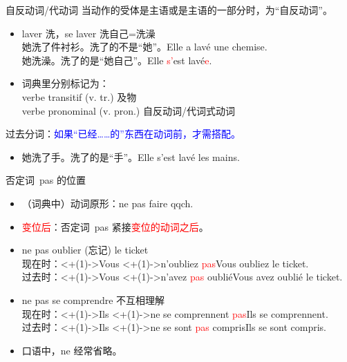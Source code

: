 \documentclass[french, aspectratio=169, 14pt, handout]{beamer}
\newcommand{\red}[1]{\textcolor{red}{#1}} %
\newcommand{\blue}[1]{\textcolor{blue}{#1}} %
\begin{document}
\begin{CJK*}{UTF8}{gkai}
\begin{frame}{自反动词/代动词}
当动作的受体是主语或是主语的一部分时，为“自反动词”。 \pause
\begin{itemize}
    \item laver 洗，se laver 洗自己=洗澡 \\
	她洗了件衬衫。洗了的不是“她”。Elle a lavé une chemise. \\
	她洗澡。洗了的是“她自己”。Elle \red{s'}est lavé\red{e}. \pause
    \item 词典里分别标记为： \\
    verbe transitif (v. tr.) 及物\\
    verbe pronominal (v. pron.) 自反动词/代词式动词 \pause
\end{itemize}
过去分词：\blue{如果“已经……的”东西在动词前，才需搭配。} \pause
\begin{itemize}
    \item 她洗了手。洗了的是“手”。Elle s'est lavé les mains.
\end{itemize}
\end{frame}

\begin{frame}{否定词~pas 的位置}
\begin{itemize}
	\item （词典中）动词原形：ne pas faire qqch.  \pause
	\item \red{变位后}：否定词~pas 紧接\red{变位的动词}\red{之后}。\pause
	\item ne pas oublier (忘记) le ticket \pause \\
	现在时：\alt<+(1)->{Vous \only<+(1)->{n'}oubliez \red{pas}}{Vous oubliez} le ticket.  \pause \\
	过去时：\alt<+(1)->{Vous \only<+(1)->{n'}avez \red{pas} oublié}{Vous avez oublié} le ticket.  \pause
	\item ne pas se comprendre 不互相理解 \pause \\
	现在时：\alt<+(1)->{Ils \only<+(1)->{ne} se comprennent \red{pas}}{Ils se comprennent}.  \pause \\
	过去时：\alt<+(1)->{Ils \only<+(1)->{ne} se sont \red{pas} compris}{Ils se sont compris}.  \pause
	\item 口语中，ne 经常省略。
\end{itemize}
\end{frame}


\end{CJK*}
\end{document}
